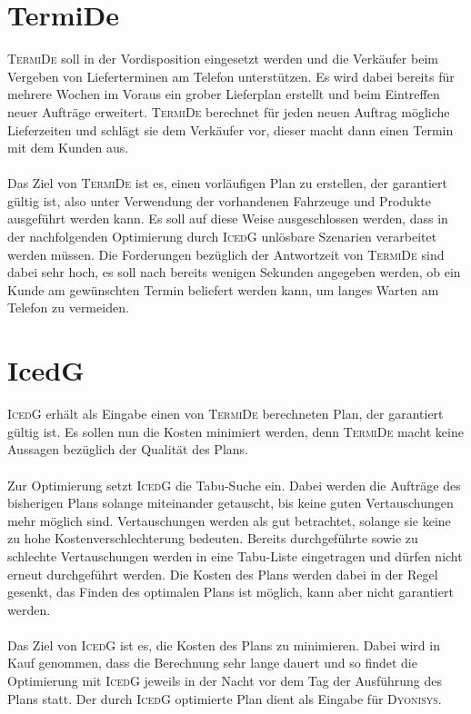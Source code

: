 \section{TermiDe}\label{chp:umfeld_termide}
\textsc{TermiDe} soll in der Vordisposition eingesetzt werden und die Verkäufer beim Vergeben von Lieferterminen am Telefon unterstützen. Es wird dabei bereits für mehrere Wochen im Voraus ein grober Lieferplan erstellt und beim Eintreffen neuer Aufträge erweitert. \textsc{TermiDe} berechnet für jeden neuen Auftrag mögliche Lieferzeiten und schlägt sie dem Verkäufer vor, dieser macht dann einen Termin mit dem Kunden aus. \\
\\
Das Ziel von \textsc{TermiDe} ist es, einen vorläufigen Plan zu erstellen, der garantiert gültig ist, also unter Verwendung der vorhandenen Fahrzeuge und Produkte ausgeführt werden kann. Es soll auf diese Weise ausgeschlossen werden, dass in der nachfolgenden Optimierung durch \textsc{IcedG} unlösbare Szenarien verarbeitet werden müssen. Die Forderungen bezüglich der Antwortzeit von \textsc{TermiDe} sind dabei sehr hoch, es soll nach bereits wenigen Sekunden angegeben werden, ob ein Kunde am gewünschten Termin beliefert werden kann, um langes Warten am Telefon zu vermeiden.


\section{IcedG}\label{chp:umfeld_icedg}
\textsc{IcedG} erhält als Eingabe einen von \textsc{TermiDe} berechneten Plan, der garantiert gültig ist. Es sollen nun die Kosten minimiert werden, denn \textsc{TermiDe} macht keine Aussagen bezüglich der Qualität des Plans. \\
\\
Zur Optimierung setzt \textsc{IcedG} die Tabu-Suche ein. Dabei werden die Aufträge des bisherigen Plans solange miteinander getauscht, bis keine guten Vertauschungen mehr möglich sind. Vertauschungen werden als gut betrachtet, solange sie keine zu hohe Kostenverschlechterung bedeuten. Bereits durchgeführte sowie zu schlechte Vertauschungen werden in eine Tabu-Liste eingetragen und dürfen nicht erneut durchgeführt werden. Die Kosten des Plans werden dabei in der Regel gesenkt, das Finden des optimalen Plans ist möglich, kann aber nicht garantiert werden. \\
\\
Das Ziel von \textsc{IcedG} ist es, die Kosten des Plans zu minimieren. Dabei wird in Kauf genommen, dass die Berechnung sehr lange dauert und so findet die Optimierung mit \textsc{IcedG} jeweils in der Nacht vor dem Tag der Ausführung des Plans statt. Der durch \textsc{IcedG} optimierte Plan dient als Eingabe für \textsc{Dyonisys}.


